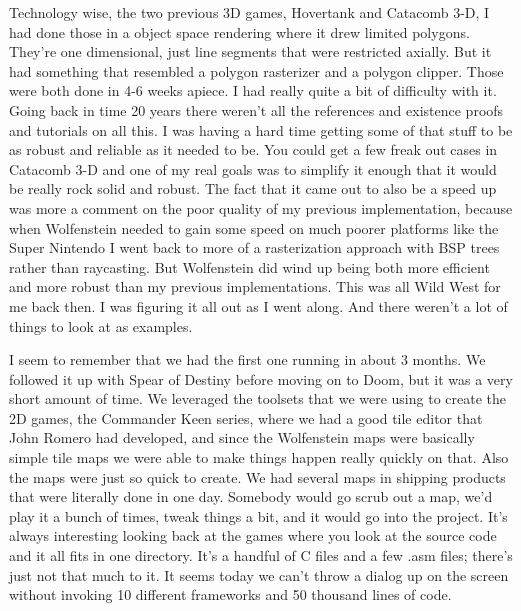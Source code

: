 Technology wise, the two previous 3D games, Hovertank and Catacomb 3-D, I had done those in a object space rendering where it drew limited polygons. They're one dimensional, just line segments that were restricted axially. But it had something that resembled a polygon rasterizer and a polygon clipper. Those were both done in 4-6 weeks apiece. I had really quite a bit of difficulty with it. Going back in time 20 years there weren't all the references and existence proofs and tutorials on all this. I was having a hard time getting some of that stuff to be as robust and reliable as it needed to be. You could get a few freak out cases in Catacomb 3-D and one of my real goals was to simplify it enough that it would be really rock solid and robust. The fact that it came out to also be a speed up was more a comment on the poor quality of my previous implementation, because when Wolfenstein needed to gain some speed on much poorer platforms like the Super Nintendo I went back to more of a rasterization approach with BSP trees rather than raycasting. But Wolfenstein did wind up being both more efficient and more robust than my previous implementations. This was all Wild West for me back then. I was figuring it all out as I went along. And there weren't a lot of things to look at as examples.\\ \par

I seem to remember that we had the first one running in about 3 months. We followed it up with Spear of Destiny before moving on to Doom, but it was a very short amount of time. We leveraged the toolsets that we were using to create the 2D games, the Commander Keen series, where we had a good tile editor that John Romero had developed, and since the Wolfenstein maps were basically simple tile maps we were able to make things happen really quickly on that. Also the maps were just so quick to create. We had several maps in shipping products that were literally done in one day. Somebody would go scrub out a map, we'd play it a bunch of times, tweak things a bit, and it would go into the project. It's always interesting looking back at the games where you look at the source code and it all fits in one directory. It's a handful of C files and a few .asm files; there's just not that much to it. It seems today we can't throw a dialog up on the screen without invoking 10 different frameworks and 50 thousand lines of code.\\ \par

